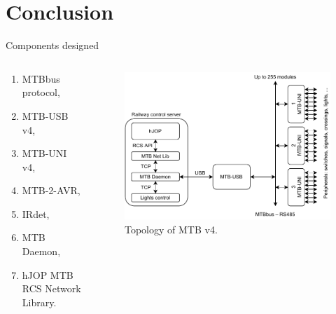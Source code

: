 \documentclass[aspectratio=169]{beamer}
\begin{document}

\section{Conclusion}

\begin{frame}{Components designed}
\begin{columns}
	\begin{column}{.5\textwidth}
		\begin{enumerate}
		\item MTBbus protocol,
		\item MTB-USB v4,
		\item MTB-UNI v4,
		\item MTB-2-AVR,
		\item IRdet,
		\item MTB Daemon,
		\item hJOP MTB RCS Network Library.
		\end{enumerate}
	\end{column}
	\begin{column}{.5\textwidth}
		\begin{figure}
		\includegraphics[width=\columnwidth]{data/new-topology-en.pdf}
		\caption{Topology of MTB v4.}
		\end{figure}
	\end{column}
\end{columns}
\end{frame}



\end{document}
